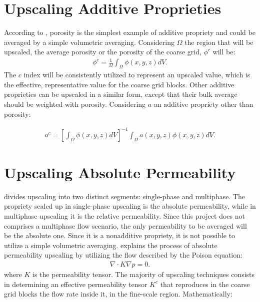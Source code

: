 \section{Upscaling Additive Proprieties}

According to \cite{Lie2015}, porosity is the simplest example of additive propriety and could be averaged by a simple volumetric averaging. Considering $\Omega$ the region that will be upscaled, the average porosity or the porosity of the coarse grid, $\phi^{c}$ will be:
\begin{align}
\label{Upscaling1}
\phi^{c}=\frac{1}{\Omega}\int_{\Omega}\phi(x,y,z)dV.
\end{align}
\noindent
The $c$ index will be consistently utilized to represent an upscaled value, which is the effective, representative value for the coarse grid blocks. Other additive proprieties can be upscaled in a similar form, except that their bulk average should be weighted with porosity. Considering $a$ an additive propriety other than porosity:

\begin{align}
\label{Upscaling3}
a^c=\left[\int_{\Omega}\phi(x,y,z)dV\right]^{-1}\int_{\Omega}a(x,y,z)\phi(x,y,z)dV.
\end{align}


\section{Upscaling Absolute Permeability}

\cite{Lie2015} divides upscaling into two distinct segments: single-phase and multiphase. The propriety scaled up in single-phase upscaling is the absolute permeability, while in multiphase upscaling it is the relative permeability. Since this project does not comprises a multiphase flow scenario, the only permeability to be averaged will be the absolute one. Since it is a nonadditive propriety, it is not possible to utilize a simple volumetric averaging. \cite{Lie2015} explains the process of absolute permeability upscaling by utilizing the flow described by the Poison equation:
\begin{align}
\label{Upscaling4}
\nabla \cdot K \nabla p = 0.
\end{align}
\noindent
where $K$ is the permeability tensor. The majority of upscaling techniques consists in determining an effective permeability tensor $K^c$ that reproduces in the coarse grid blocks the flow rate inside it, in the fine-scale region. Mathematically:

